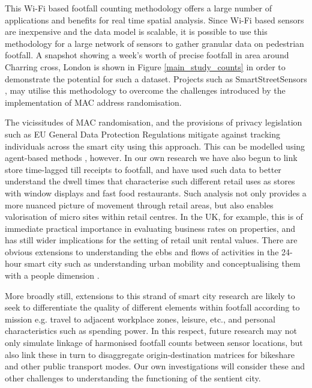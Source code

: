 This Wi-Fi based footfall counting methodology offers a large number of
applications and benefits for real time spatial analysis. Since Wi-Fi based
sensors are inexpensive and the data model is scalable, it is possible to use
this methodology for a large network of sensors to gather granular data on
pedestrian footfall. A snapshot showing a week’s worth of precise footfall in
area around Charring cross, London is shown in Figure \ref{main_study_counts} in
order to demonstrate the potential for such a dataset. Projects such as
SmartStreetSensors \citep{cdrc2018consumer}, may utilise this methodology to
overcome the challenges introduced by the implementation of MAC address
randomisation.

The vicissitudes of MAC randomisation, and the provisions of privacy
legislation such as EU General Data Protection Regulations mitigate against
tracking individuals across the smart city using this approach.  This can be
modelled using agent-based methods \citep{heppenstall2011agent}, however. In
our own research we have also begun to link store time-lagged till receipts to
footfall, and have used such data to better understand the dwell times that
characterise such different retail uses as stores with window displays and fast
food restaurants.  Such analysis not only provides a more nuanced picture of
movement through retail areas, but also enables valorisation of micro sites
within retail centres. In the UK, for example, this is of immediate practical
importance in evaluating business rates on properties, and has still wider
implications for the setting of retail unit rental values. There are obvious
extensions to understanding the ebbs and flows of activities in the 24-hour
smart city such as understanding urban mobility \citep{gariazzo2019spatio} and
conceptualising them with a people dimension \citep{nam2011conceptualizing}.

More broadly still, extensions to this strand of smart city research are likely
to seek to differentiate the quality of different elements within footfall
according to mission e.g. travel to adjacent workplace zones, leisure, etc., and
personal characteristics such as spending power. In this respect, future
research may not only simulate linkage of harmonised footfall counts between
sensor locations, but also link these in turn to disaggregate origin-destination
matrices for bikeshare and other public transport modes.  Our own investigations
will consider these and other challenges to understanding the functioning of the
sentient city.
